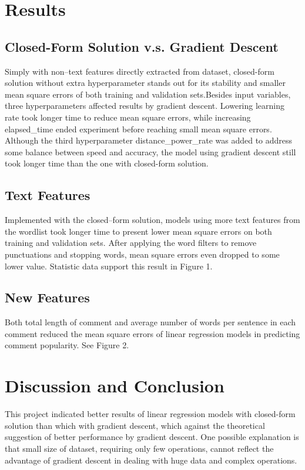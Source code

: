 \documentclass[letterpaper, 11pt]{article}
\begin{document}
\section*{Results}


\subsection*{Closed-Form Solution v.s. Gradient Descent}

Simply with non\---text features directly extracted from dataset, closed-form solution without extra hyperparameter stands out for its stability and smaller mean square errors of both training and validation sets.Besides input variables, three hyperparameters affected results by gradient descent. Lowering learning rate took longer time to reduce mean square errors, while increasing elapsed\_time ended experiment before reaching small mean square errors. Although the third hyperparameter distance\_power\_rate was added to address some balance between speed and accuracy, the model using gradient descent still took longer time than the one with closed-form solution.

\subsection*{Text Features}

Implemented with the closed\---form solution, models using more text features from the wordlist took longer time to present lower mean square errors on both training and validation sets. After applying the word filters to remove punctuations and stopping words, mean square errors even dropped to some lower value. Statistic data support this result in Figure 1.


\subsection*{New Features}
Both total length of comment and average number of words per sentence in each comment reduced the mean square errors of linear regression models in predicting comment popularity. See Figure 2.

\section*{Discussion and Conclusion}

This project indicated better results of linear regression models with closed-form solution than which with gradient descent, which against the theoretical suggestion of better performance by gradient descent. One possible explanation is that small size of dataset, requiring only few operations, cannot reflect the advantage of gradient descent in dealing with huge data and complex operations.
\end{document}
